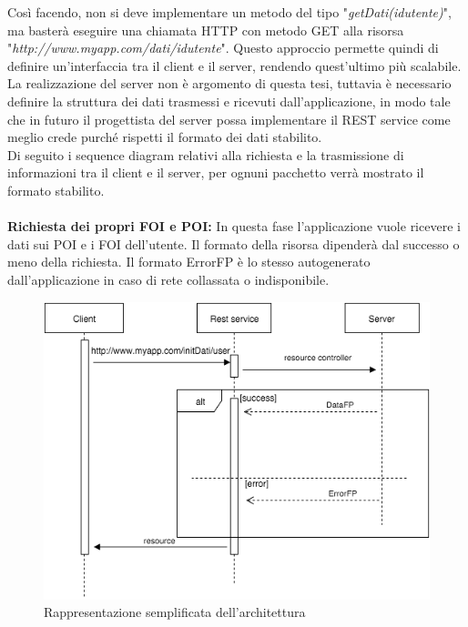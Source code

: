Così facendo, non si deve implementare un metodo del tipo "\textit{getDati(idutente)}", ma basterà eseguire una chiamata HTTP con metodo GET alla risorsa \\
"\textit{http://www.myapp.com/dati/idutente}". Questo approccio permette quindi di definire un'interfaccia tra il client e il server, rendendo quest'ultimo più scalabile. 
La realizzazione del server non è argomento di questa tesi, tuttavia è necessario definire la struttura dei dati trasmessi e ricevuti dall'applicazione, in modo tale che in futuro il progettista del server possa implementare il REST service come meglio crede purché rispetti il formato dei dati stabilito. \\
Di seguito i sequence diagram relativi alla richiesta e la trasmissione di informazioni tra il client e il server, per ognuni pacchetto verrà mostrato il formato stabilito.\\ \\
 \textbf{Richiesta dei propri FOI e POI:} In questa fase l'applicazione vuole ricevere i dati sui POI e i FOI dell'utente. Il formato della risorsa dipenderà dal successo o meno della richiesta. Il formato ErrorFP è lo stesso autogenerato dall'applicazione in caso di rete collassata o indisponibile.
 \begin{figure}[H]
	\centering
	\includegraphics[scale=0.7]{Implementazione/foipois.png}
	\caption{Rappresentazione semplificata dell'architettura }
	\label{fig:rest}
\end{figure}
